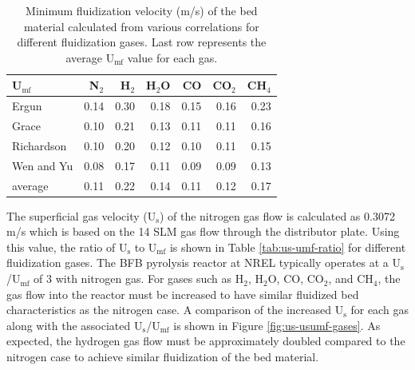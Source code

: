 \documentclass{article}
\begin{document}
\begin{table}[H]
    \centering
    \caption{Minimum fluidization velocity (m/s) of the bed material calculated from various correlations for different fluidization gases. Last row represents the average U$_\text{mf}$ value for each gas.}
    \label{tab:umf-sand}
    \begin{tabular}{lrrrrrr}
        \toprule
        U$_\text{mf}$ & N$_2$ & H$_2$ & H$_2$O & CO & CO$_2$ & CH$_4$ \\
        \midrule
        Ergun         & 0.14 & 0.30 & 0.18 & 0.15 & 0.16 & 0.23 \\
        Grace         & 0.10 & 0.21 & 0.13 & 0.11 & 0.11 & 0.16 \\
        Richardson    & 0.10 & 0.20 & 0.12 & 0.10 & 0.11 & 0.15 \\
        Wen and Yu    & 0.08 & 0.17 & 0.11 & 0.09 & 0.09 & 0.13 \\
        average       & 0.11 & 0.22 & 0.14 & 0.11 & 0.12 & 0.17 \\
        \bottomrule
    \end{tabular}
\end{table}

The superficial gas velocity (U$_\text{s}$) of the nitrogen gas flow is calculated as 0.3072 m/s which is based on the 14 SLM gas flow through the distributor plate. Using this value, the ratio of U$_\text{s}$ to U$_\text{mf}$ is shown in Table \ref{tab:us-umf-ratio} for different fluidization gases. The BFB pyrolysis reactor at NREL typically operates at a U$_\text{s}$/U$_\text{mf}$ of 3 with nitrogen gas. For gases such as H$_2$, H$_2$O, CO, CO$_2$, and CH$_4$, the gas flow into the reactor must be increased to have similar fluidized bed characteristics as the nitrogen case. A comparison of the increased U$_\text{s}$ for each gas along with the associated U$_\text{s}$/U$_\text{mf}$ is shown in Figure \ref{fig:us-usumf-gases}. As expected, the hydrogen gas flow must be approximately doubled compared to the nitrogen case to achieve similar fluidization of the bed material.
\end{document}

